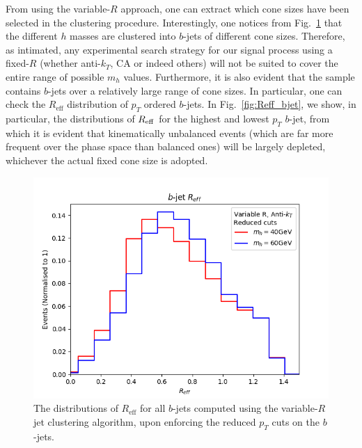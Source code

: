 \documentclass[12pt]{article}
\begin{document}
From using the variable-$R$ approach, one can extract which cone sizes have been selected in the clustering procedure.
Interestingly, one notices from Fig.~\ref{fig:Reff} that the different $h$ masses are clustered into
$b$-jets of different cone sizes. Therefore, as intimated, any experimental search strategy for our signal process using a
fixed-$R$ (whether anti-$k_T$, CA or indeed others) will not be suited to cover the entire range of possible $m_h$ values.
Furthermore, it is also evident that the sample contains $b$-jets
over a relatively large range of cone sizes. In particular, one can check the $R_{\text{eff}}$ distribution of
$p_T$ ordered $b$-jets. In Fig.~\ref{fig:Reff_bjet}, we show, in particular, the distributions of $R_{\rm eff}$ for the highest
  and lowest $p_T$ $b$-jet, from which it is evident that kinematically unbalanced events (which are far more frequent over the phase space than
balanced ones) will be largely depleted, whichever the actual fixed cone size is adopted.


\begin{figure}[htb!]
	\centering
	\includegraphics[scale=0.6]{plots/Reff_all.png}
	\caption{The distributions of $R_{\text{eff}}$ for all $b$-jets computed using the variable-$R$ jet clustering algorithm, upon enforcing the reduced $p_T$ cuts on the $b$-jets.}
\label{fig:Reff}
\end{figure}
\end{document}
